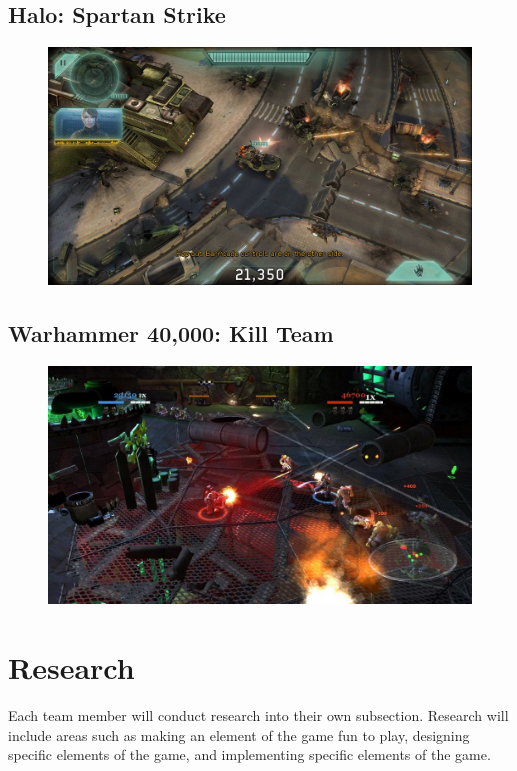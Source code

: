 \documentclass[11pt]{article}
\begin{document}
\subsection*{Halo: Spartan Strike}
\begin{figure}[H]
	\includegraphics[scale=0.25]{halo_spartan_strike.jpg}
	\centering
\end{figure}
\subsection*{Warhammer 40,000: Kill Team}
\begin{figure}[H]
	\includegraphics[scale=0.5]{warhammer.png}
	\centering
\end{figure}

\section*{Research}
Each team member will conduct research into their own subsection. Research
will include areas such as making an element of the game fun to play, designing
specific elements of the game, and implementing specific elements of the game.
\end{document}

